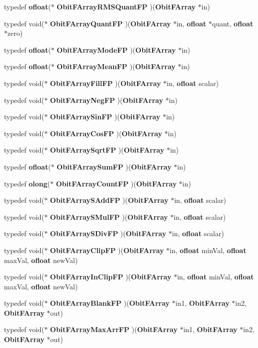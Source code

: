 \begin{CompactItemize}
\item 
typedef {\bf ofloat}($\ast$ {\bf Obit\-FArray\-RMSQuant\-FP} )({\bf Obit\-FArray} $\ast$in)
\item 
typedef void($\ast$ {\bf Obit\-FArray\-Quant\-FP} )({\bf Obit\-FArray} $\ast$in, {\bf ofloat} $\ast$quant, {\bf ofloat} $\ast$zero)
\item 
typedef {\bf ofloat}($\ast$ {\bf Obit\-FArray\-Mode\-FP} )({\bf Obit\-FArray} $\ast$in)
\item 
typedef {\bf ofloat}($\ast$ {\bf Obit\-FArray\-Mean\-FP} )({\bf Obit\-FArray} $\ast$in)
\item 
typedef void($\ast$ {\bf Obit\-FArray\-Fill\-FP} )({\bf Obit\-FArray} $\ast$in, {\bf ofloat} scalar)
\item 
typedef void($\ast$ {\bf Obit\-FArray\-Neg\-FP} )({\bf Obit\-FArray} $\ast$in)
\item 
typedef void($\ast$ {\bf Obit\-FArray\-Sin\-FP} )({\bf Obit\-FArray} $\ast$in)
\item 
typedef void($\ast$ {\bf Obit\-FArray\-Cos\-FP} )({\bf Obit\-FArray} $\ast$in)
\item 
typedef void($\ast$ {\bf Obit\-FArray\-Sqrt\-FP} )({\bf Obit\-FArray} $\ast$in)
\item 
typedef {\bf ofloat}($\ast$ {\bf Obit\-FArray\-Sum\-FP} )({\bf Obit\-FArray} $\ast$in)
\item 
typedef {\bf olong}($\ast$ {\bf Obit\-FArray\-Count\-FP} )({\bf Obit\-FArray} $\ast$in)
\item 
typedef void($\ast$ {\bf Obit\-FArray\-SAdd\-FP} )({\bf Obit\-FArray} $\ast$in, {\bf ofloat} scalar)
\item 
typedef void($\ast$ {\bf Obit\-FArray\-SMul\-FP} )({\bf Obit\-FArray} $\ast$in, {\bf ofloat} scalar)
\item 
typedef void($\ast$ {\bf Obit\-FArray\-SDiv\-FP} )({\bf Obit\-FArray} $\ast$in, {\bf ofloat} scalar)
\item 
typedef void($\ast$ {\bf Obit\-FArray\-Clip\-FP} )({\bf Obit\-FArray} $\ast$in, {\bf ofloat} min\-Val, {\bf ofloat} max\-Val, {\bf ofloat} new\-Val)
\item 
typedef void($\ast$ {\bf Obit\-FArray\-In\-Clip\-FP} )({\bf Obit\-FArray} $\ast$in, {\bf ofloat} min\-Val, {\bf ofloat} max\-Val, {\bf ofloat} new\-Val)
\item 
typedef void($\ast$ {\bf Obit\-FArray\-Blank\-FP} )({\bf Obit\-FArray} $\ast$in1, {\bf Obit\-FArray} $\ast$in2, {\bf Obit\-FArray} $\ast$out)
\item 
typedef void($\ast$ {\bf Obit\-FArray\-Max\-Arr\-FP} )({\bf Obit\-FArray} $\ast$in1, {\bf Obit\-FArray} $\ast$in2, {\bf Obit\-FArray} $\ast$out)

\end{CompactItemize}
